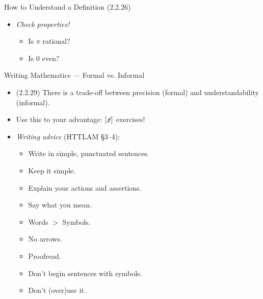 \begin{frame}{How to Understand a Definition (2.2.26)}
\begin{itemize}
\begin{itemize}
			\begin{itemize}
			
				\item Can we define primes in another way?
				
				\item  Is there another definition of $\pi$?			
			\end{itemize}
			
			\item \emph{Check properties!}
			
			\begin{itemize}
			
				\item Is $\pi$ rational?
				
				\item  Is $0$ even?	
						
			\end{itemize}
		
		\end{itemize}
		
\end{itemize}

\end{frame}

\begin{frame}{Writing Mathematics --- Formal vs. Informal}

	\begin{itemize}
	
		\item (2.2.29) There is a trade-off between precision (formal) and understandability (informal).
		
		\item Use this to your advantage: $[\not\hspace{-.5ex}x]$ exercises!
		
		\item \emph{Writing advice} (HTTLAM \S3--4):
		
		\begin{itemize}
		
			\item Write in simple, punctuated sentences.
			\item Keep it simple.
			\item Explain your actions and assertions.
			\item Say what you mean.
			\item Words $>$ Symbols.
			\item No arrows.
			\item Proofread.
			\item Don't begin sentences with symbols.
			\item Don't (over)use it.
			
		\end{itemize}

	
	\end{itemize}

\end{frame}

